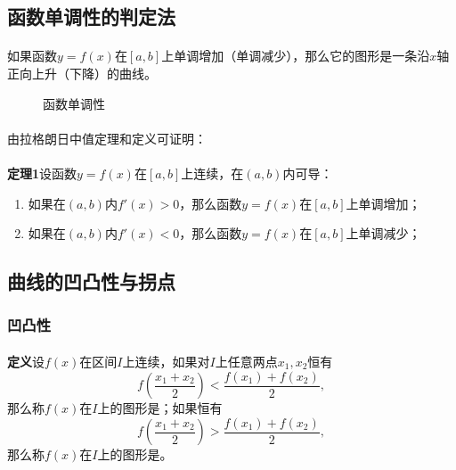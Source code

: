 \subsection{函数单调性的判定法}
\paragraph{}
如果函数$y=f(x)$在$[a,b]$上单调增加（单调减少），那么它的图形是一条沿$x$轴正向上升（下降）的曲线。

\begin{figure}[H]
\centering
  \begin{subfigure}[t]{0.48\linewidth}
    \centering
      
  \end{subfigure}
  \begin{subfigure}[t]{0.48\linewidth}
    \centering
      
  \end{subfigure}
  \caption{函数单调性}
  \label{函数单调性}
\end{figure}

\paragraph{}
由拉格朗日中值定理和定义可证明：

\paragraph{}
\textbf{定理1\;}设函数$y=f(x)$在$[a,b]$上连续，在$(a,b)$内可导：
\begin{enumerate}
  \item 如果在$(a,b)$内$f'(x) > 0$，那么函数$y=f(x)$在$[a,b]$上单调增加；
  \item 如果在$(a,b)$内$f'(x) < 0$，那么函数$y=f(x)$在$[a,b]$上单调减少；
\end{enumerate}

\subsection{曲线的凹凸性与拐点}
\subsubsection{凹凸性}
\paragraph{}
\textbf{定义\;}设$f(x)$在区间$I$上连续，如果对$I$上任意两点$x_1,x_2$恒有
\begin{equation}
  f(\frac{x_1+x_2}{2}) < \frac{f(x_1) + f(x_2)}{2},
\end{equation}
那么称$f(x)$在$I$上的图形是；如果恒有
\begin{equation}
  f(\frac{x_1+x_2}{2}) > \frac{f(x_1)+f(x_2)}{2},
\end{equation}
那么称$f(x)$在$I$上的图形是。

